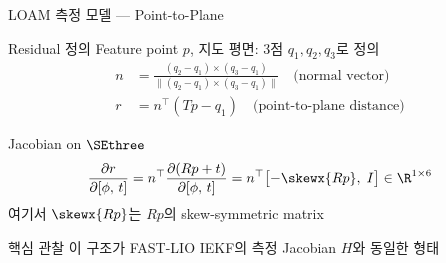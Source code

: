 \begin{frame}{LOAM 측정 모델 — Point-to-Plane}
  \begin{block}{Residual 정의}
    Feature point $p$, 지도 평면: 3점 $q_1, q_2, q_3$로 정의
    \begin{align*}
      n &= \frac{(q_2 - q_1) \times (q_3 - q_1)}
               {\|(q_2 - q_1) \times (q_3 - q_1)\|}
               \quad \text{(normal vector)}\\[4pt]
      r &= n^\top(Tp - q_1) \quad \text{(point-to-plane distance)}
    \end{align*}
  \end{block}
  \pause
  \begin{block}{Jacobian on $\SEthree$}
    \begin{align*}
      \frac{\partial r}{\partial [\phi,\, t]}
      = n^\top \frac{\partial (Rp + t)}{\partial [\phi,\, t]}
      = n^\top \bigl[-\skewx{Rp},\; I\bigr]
      \in \R^{1 \times 6}
    \end{align*}
    여기서 $\skewx{Rp}$는 $Rp$의 skew-symmetric matrix
  \end{block}
  \pause
  \begin{exampleblock}{핵심 관찰}
    이 구조가 FAST-LIO IEKF의 측정 Jacobian $H$와 동일한 형태
  \end{exampleblock}
\end{frame}

